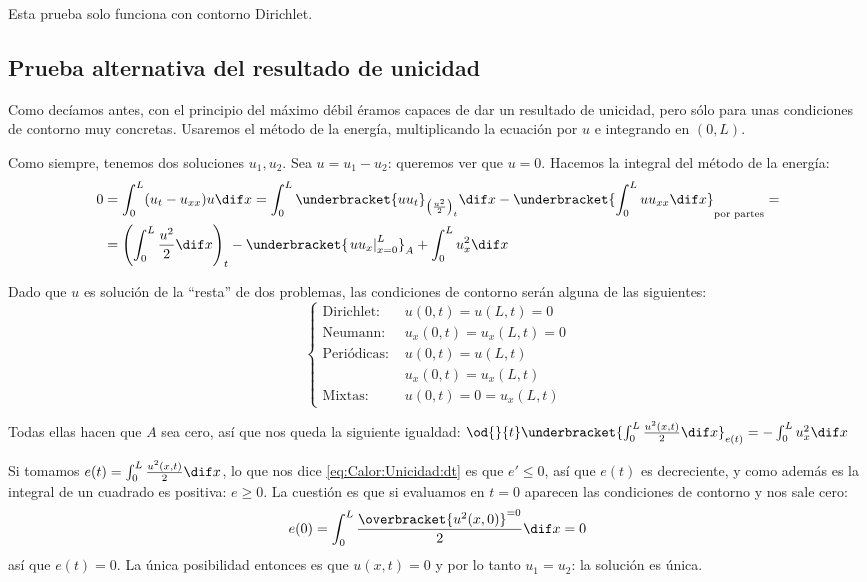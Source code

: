 	\obs Esta prueba solo funciona con contorno Dirichlet.


	\subsection{Prueba alternativa del resultado de unicidad}
		\label{sec:Calor:Unicidad}

		Como decíamos antes, con el principio del máximo débil éramos capaces de dar un resultado de unicidad, pero sólo para unas condiciones de contorno muy concretas. Usaremos el método de la energía, multiplicando la ecuación por $u$ e integrando en $(0,L)$.

		Como siempre, tenemos dos soluciones $u_1, u_2$. Sea $u = u_1 - u_2$: queremos ver que $u = 0$. Hacemos la integral del método de la energía:
		\begin{align*}
			0 &= \int_0^L (u_t-u_{xx}) u \dif x = \int_0^L \underbracket{u u_t}_{\left(\frac{u^2}{2}\right)_t} \dif x - \underbracket{\int_0^L u u_{xx} \dif x}_{\text{por partes}} =  \\
			&= \left(\int_0^L \frac{u^2}{2}\dif x\right)_t - \underbracket{\left. u u_x \right|_{x=0}^L}_{A} + \int_0^L u^2_x \dif x
		\end{align*}

		Dado que $u$ es solución de la ``resta'' de dos problemas, las condiciones de contorno serán alguna de las siguientes:
		\[ \begin{cases}
			\text{Dirichlet: }	& u(0,t) = u(L,t) = 0 \\
			\text{Neumann: }	& u_x(0,t) = u_x(L,t) = 0 \\
			\text{Periódicas: } & u(0,t) = u(L,t) \\
								& u_x(0,t) = u_x(L,t) \\
			\text{Mixtas: }	& u(0,t) = 0 = u_x(L,t)
		\end{cases}\]

		Todas ellas hacen que $A$ sea cero, así que nos queda la siguiente igualdad:
		\( \od{}{t} \underbracket{\int_0^L \frac{u^2(x,t)}{2} \dif x}_{e(t)} = - \int_0^L u^2_x \dif x \label{eq:Calor:Unicidad:dt} \)

		Si tomamos $e(t) = \int_0^L \frac{u^2(x,t)}{2} \dif x$, lo que nos dice \eqref{eq:Calor:Unicidad:dt} es que $e' ≤ 0$, así que $e(t)$ es decreciente, y como además es la integral de un cuadrado es positiva: $e ≥ 0$. La cuestión es que si evaluamos en $t = 0$ aparecen las condiciones de contorno y nos sale cero: \[ e(0) = \int_0^L \frac{\overbracket{u^2(x,0)}^{=0}}{2} \dif x = 0 \] así que $e (t) = 0$. La única posibilidad entonces es que $u(x,t) = 0$ y por lo tanto $u_1 = u_2$: la solución es única.

